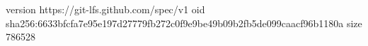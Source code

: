version https://git-lfs.github.com/spec/v1
oid sha256:6633bfcfa7e95e197d27779fb272c0f9e9be49b09b2fb5de099caacf96b1180a
size 786528
